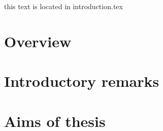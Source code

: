 this text is located in introduction.tex

\section{Overview}


\section{Introductory remarks}


\section{Aims of thesis}

